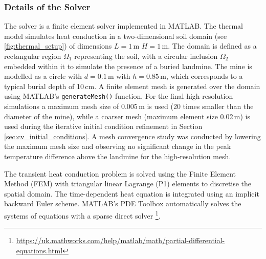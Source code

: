     
    \subsubsection{Details of the Solver}
    
        The solver is a finite element solver implemented in MATLAB. The thermal model simulates heat conduction in a two-dimensional soil domain (see \ref{fig:thermal_setup}) of dimensions $L =1$\,m $H = 1$\,m. The domain is defined as a rectangular region $\Omega_1$ representing the soil, with a circular inclusion $\Omega_2$ embedded within it to simulate the presence of a buried landmine. The mine is modelled as a circle with \(d=0.1\,\text{m}\) with \(h=0.85\,\text{m}\), which corresponds to a typical burial depth of 10\,cm. A finite element mesh is generated over the domain using MATLAB's \texttt{generateMesh()} function. For the final high-resolution simulations a maximum mesh size of 0.005\,m is used (20 times smaller than the diameter of the mine), while a coarser mesh (maximum element size 0.02\,m) is used during the iterative initial condition refinement in Section \ref{sec:cv_initial_conditions}. A mesh convergence study was conducted by lowering the maximum mesh size and observing no significant change in the peak temperature difference above the landmine for the high-resolution mesh.
        
        The transient heat conduction problem is solved using the Finite Element Method (FEM) with triangular linear Lagrange (P1) elements to discretise the spatial domain. The time-dependent heat equation is integrated using an implicit backward Euler scheme. MATLAB's PDE Toolbox automatically solves the systems of equations with a sparse direct solver \footnote{\url{https://uk.mathworks.com/help/matlab/math/partial-differential-equations.html}}.
    
